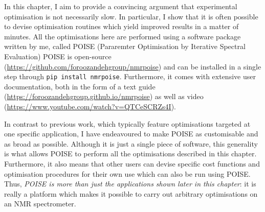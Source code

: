 In this chapter, I aim to provide a convincing argument that experimental optimisation is not necessarily slow.
In particular, I show that it is often possible to devise optimisation routines which yield improved results in a matter of minutes.
All the optimisations here are performed using a software package written by me, called POISE (Pararemter Optimisation by Iterative Spectral Evaluation)
POISE is open-source (\url{https://github.com/foroozandehgroup/nmrpoise}) and can be installed in a single step through \texttt{pip install nmrpoise}.
Furthermore, it comes with extensive user documentation, both in the form of a text guide (\url{https://foroozandehgroup.github.io/nmrpoise}) as well as video (\url{https://www.youtube.com/watch?v=QTCeSCRZs4I}).

In contrast to previous work, which typically feature optimisations targeted at one specific application, I have endeavoured to make POISE as customisable and as broad as possible.
Although it is just a single piece of software, this generality is what allows POISE to perform all the optimisations described in this chapter.
Furthermore, it also means that other users can devise specific cost functions and optimisation procedures for their own use which can also be run using POISE.
Thus, \textit{POISE is more than just the applications shown later in this chapter}: it is really a platform which makes it possible to carry out arbitrary optimisations on an NMR spectrometer.

